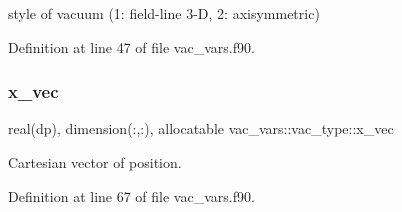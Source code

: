 style of vacuum (1\+: field-\/line 3-\/D, 2\+: axisymmetric) 



Definition at line 47 of file vac\+\_\+vars.\+f90.

\mbox{\label{structvac__vars_1_1vac__type_ae485365ab16528f580d33805ba4633d3}} 
\subsubsection{\texorpdfstring{x\+\_\+vec}{x\_vec}}
{\footnotesize\ttfamily real(dp), dimension(\+:,\+:), allocatable vac\+\_\+vars\+::vac\+\_\+type\+::x\+\_\+vec}



Cartesian vector of position. 



Definition at line 67 of file vac\+\_\+vars.\+f90.



